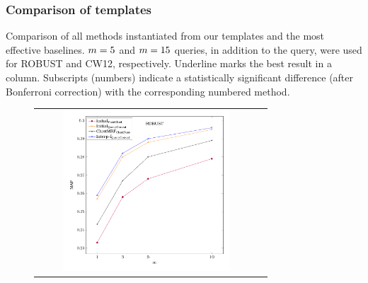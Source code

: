 \subsubsection{Comparison of templates}
\label{sec:compTemplate}
\begin{table}[t]
\caption{\label{tab:compAll} Comparison of all methods instantiated
  from our templates and the most effective baselines. $m=5$ and $m=15$ queries, in addition to the \titleQuery query, were used for ROBUST and CW12, respectively. Underline
  marks the best result in a column. Subscripts (numbers) indicate a statistically significant difference (after Bonferroni correction) with the corresponding numbered method.}
 
\end{table}
\newcommand{\figWidth}{8cm}
\newcommand{\figHeight}{6cm}
\begin{figure}[t]
  \begin{tabular}{cc}
\includegraphics[width=\figWidth, height=\figHeight]{Results2/robust.pdf} &

\end{tabular}
\end{figure}
